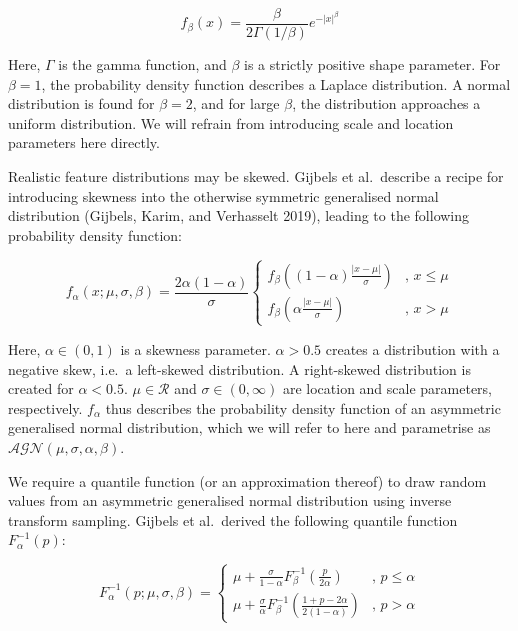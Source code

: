 \documentclass[preprint,12pt,authoryear]{elsarticle}
\begin{document}
\begin{equation}
f_{\beta}(x) = \frac{\beta}{2\Gamma\left(1 / \beta \right)} e^{-\left| x \right|^\beta}
\end{equation}

Here, \(\Gamma\) is the gamma function, and \(\beta\) is a strictly
positive shape parameter. For \(\beta = 1\), the probability density
function describes a Laplace distribution. A normal distribution is
found for \(\beta=2\), and for large \(\beta\), the distribution
approaches a uniform distribution. We will refrain from introducing
scale and location parameters here directly.

Realistic feature distributions may be skewed. Gijbels et al.~describe a
recipe for introducing skewness into the otherwise symmetric generalised
normal distribution (Gijbels, Karim, and Verhasselt 2019), leading to
the following probability density function:

\begin{equation}
f_{\alpha}(x; \mu, \sigma, \beta) = \frac{2 \alpha \left(1 - \alpha\right)}{\sigma}
\begin{cases}
f_{\beta}\left( \left(1 - \alpha \right) \frac{\left| x - \mu \right|}{\sigma} \right) & \text{, } x \leq \mu \\
f_{\beta}\left( \alpha \frac{\left| x - \mu \right|}{\sigma} \right) & \text{, } x > \mu
\end{cases}
\end{equation}

Here, \(\alpha \in (0,1)\) is a skewness parameter. \(\alpha > 0.5\)
creates a distribution with a negative skew, i.e.~a left-skewed
distribution. A right-skewed distribution is created for
\(\alpha < 0.5\). \(\mu \in \mathcal{R}\) and \(\sigma \in (0, \infty)\)
are location and scale parameters, respectively. \(f_{\alpha}\) thus
describes the probability density function of an asymmetric generalised
normal distribution, which we will refer to here and parametrise as
\(\mathcal{AGN}\left(\mu, \sigma, \alpha, \beta \right)\).

We require a quantile function (or an approximation thereof) to draw
random values from an asymmetric generalised normal distribution using
inverse transform sampling. Gijbels et al.~derived the following
quantile function \(F_{\alpha}^{-1}(p)\):

\begin{equation}
F_{\alpha}^{-1}(p; \mu, \sigma, \beta) =
\begin{cases}
\mu + \frac{\sigma}{1 - \alpha} F_{\beta}^{-1} \left( \frac{p}{2 \alpha}\right) & \text{, } p \leq \alpha \\
\mu + \frac{\sigma}{\alpha} F_{\beta}^{-1} \left( \frac{1 + p - 2 \alpha}{2 \left(1 - \alpha \right)} \right) & \text{, } p > \alpha
\end{cases}
\end{equation}
\end{document}
